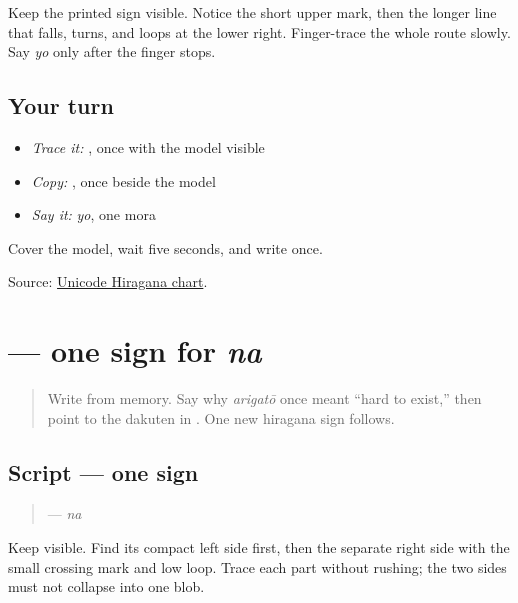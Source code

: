 Keep the printed sign visible. Notice the short upper mark, then the longer line that falls, turns, and loops at the lower right. Finger-trace the whole route slowly. Say \emph{yo} only after the finger stops.

\subsection*{Your turn}
\begin{itemize}
\raggedright
  \item \emph{Trace it:} \textbf{}, once with the model visible
  \item \emph{Copy:} \textbf{}, once beside the model
  \item \emph{Say it:} \emph{yo}, one mora
\end{itemize}

\begin{tcolorbox}[breakable,colback=teal!4,colframe=teal!35!black,title={Before you move on}]
Cover the model, wait five seconds, and write \textbf{} once.

Source: \href{https://www.unicode.org/charts/PDF/U3040.pdf}{Unicode Hiragana chart}.
\end{tcolorbox}
\section[\texorpdfstring{\ja{な} (na)}{な (na)}]{ — one sign for \emph{na}}

\label{lesson:JA-W08-na}



\begin{quote}
Write \textbf{} from memory. Say why \emph{arigatō} once meant “hard to exist,” then point to the dakuten in \textbf{}. One new hiragana sign follows.
\end{quote}

\subsection*{Script — one sign}

\begin{quote}
\textbf{} — \emph{na}
\end{quote}

Keep \textbf{} visible. Find its compact left side first, then the separate right side with the small crossing mark and low loop. Trace each part without rushing; the two sides must not collapse into one blob.


